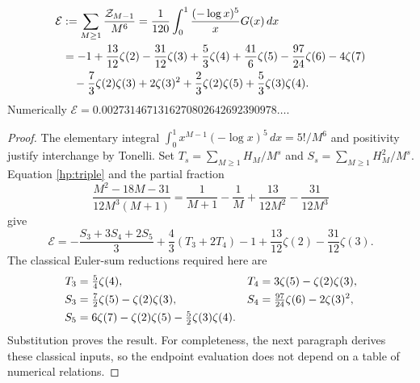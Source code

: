 \begin{corollary}\label{hp:endpoint}
\begin{align}
 \mathcal E
 &:=\sum_{M\ge1}\frac{\mathcal Z_{M-1}}{M^6}
   =\frac1{120}\int_0^1\frac{(-\log x)^5}{x}G(x)\,dx
       \notag\\
 &=-1+\frac{13}{12}\zeta(2)-\frac{31}{12}\zeta(3)
       +\frac53\zeta(4)+\frac{41}{6}\zeta(5)
       -\frac{97}{24}\zeta(6)-4\zeta(7)\notag\\
 &\hspace{1em}-\frac73\zeta(2)\zeta(3)+2\zeta(3)^2
       +\frac23\zeta(2)\zeta(5)+\frac53\zeta(3)\zeta(4).
 \label{hp:endpoint-value}
\end{align}
Numerically $\mathcal E=0.0027314671316270802642692390978\ldots$.
\end{corollary}
\begin{proof}
The elementary integral
$\int_0^1x^{M-1}(-\log x)^5\,dx=5!/M^6$ and positivity
justify interchange by Tonelli. Set
$T_s=\sum_{M\ge1}H_M/M^s$ and
$S_s=\sum_{M\ge1}H_M^2/M^s$. Equation \eqref{hp:triple}
and the partial fraction
\[
 \frac{M^2-18M-31}{12M^3(M+1)}
 =\frac1{M+1}-\frac1M+\frac{13}{12M^2}-\frac{31}{12M^3}
\]
give
\begin{equation}\label{hp:euler-reduction}
 \mathcal E=-\frac{S_3+3S_4+2S_5}{3}
         +\frac43(T_3+2T_4)
         -1+\frac{13}{12}\zeta(2)-\frac{31}{12}\zeta(3).
\end{equation}
The classical Euler-sum reductions required here are
\begin{align}
 T_3&=\tfrac54\zeta(4),&
 T_4&=3\zeta(5)-\zeta(2)\zeta(3),\notag\\
 S_3&=\tfrac72\zeta(5)-\zeta(2)\zeta(3),&
 S_4&=\tfrac{97}{24}\zeta(6)-2\zeta(3)^2,\notag\\
 S_5&=6\zeta(7)-\zeta(2)\zeta(5)
                         -\tfrac52\zeta(3)\zeta(4).
 \label{hp:euler-values}
\end{align}
Substitution proves the result. For completeness, the next
paragraph derives these classical inputs, so the endpoint
evaluation does not depend on a table of numerical relations.
\end{proof}

